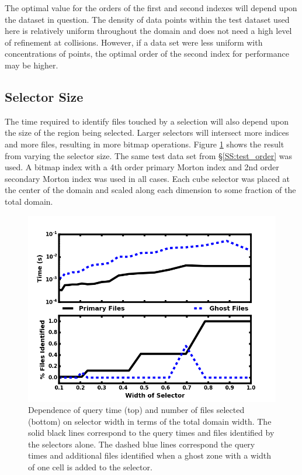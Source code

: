 \documentclass[apjl]{emulateapj}
\begin{document}
The optimal value for the orders of the first and second indexes will depend upon the dataset in question. The density of data points within the test dataset used here is relatively uniform throughout the domain and does not need a high level of refinement at collisions. However, if a data set were less uniform with concentrations of points, the optimal order of the second index for performance may be higher.

\subsection{Selector Size}\label{SS:test_size}
%
The time required to identify files touched by a selection will also depend upon the size of the region being selected. Larger selectors will intersect more indices and more files, resulting in more bitmap operations. Figure \ref{fig:test_size} shows the result from varying the selector size. The same test data set from \S\ref{SS:test_order} was used. A bitmap index with a 4th order primary Morton index and 2nd order secondary Morton index was used in all cases. Each cube selector was placed at the center of the domain and scaled along each dimension to some fraction of the total domain.
%
\begin{figure}[htbp]
\begin{center}
\includegraphics[width=\columnwidth,keepaspectratio]{../images/vary_selector.png}
\caption{Dependence of query time (top) and number of files selected (bottom) on selector width in terms of the total domain width. The solid black lines correspond to the query times and files identified by the selectors alone. The dashed blue lines correspond the query times and additional files identified when a ghost zone with a width of one cell is added to the selector.}
\label{fig:test_size}
\end{center}
\end{figure}
%
\end{document}

